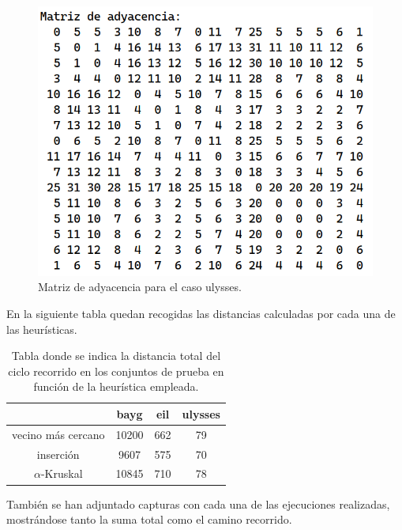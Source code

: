 \begin{figure}[H]
  \centering
  \includegraphics[scale=0.5]{img/ady-ulysses.png}
  \caption{Matriz de adyacencia para el caso ulysses.}
\end{figure}

En la siguiente tabla quedan recogidas las distancias calculadas por cada una de las heurísticas.

\begin{table}[H]
    \centering
    \begin{tabular}{|c|c|c|c|}
      \hline
      & bayg & eil & ulysses \\
      \hline
      vecino más cercano & 10200 & 662 & 79 \\
      \hline
      inserción & 9607 & 575 & 70 \\
      \hline
      $\alpha$-Kruskal & 10845 & 710 & 78 \\
      \hline
    \end{tabular}
    \caption{Tabla donde se indica la distancia total del ciclo recorrido en los conjuntos de prueba
    en función de la heurística empleada.}
\end{table}



También se han adjuntado capturas con cada una de las ejecuciones realizadas, mostrándose tanto la suma
total como el camino recorrido.

